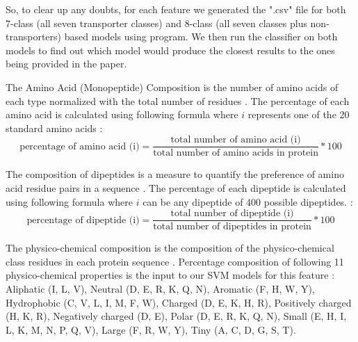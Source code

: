     So, to clear up any doubts, for each feature we generated the ".csv" file for both 7-class (all seven transporter classes) and 8-class 
    (all seven classes plus non-transporters) based models using  program. We then run the 
    classifier on both models to find out which model would produce the closest results to the ones being provided in the paper.
    
    
    
    The Amino Acid (Monopeptide) Composition is the number of amino acids of each type normalized with the total number of 
    residues \cite{gromiha2010protein}. The percentage of each amino acid is calculated using following formula where $i$ 
    represents one of the 20 standard amino acids \cite{mishra2014prediction} :
    \begin{equation}
        \text{percentage of amino acid (i)} = \frac {\text{total number of amino acid (i)}} {\text{total number of amino acids in protein}} * 100
    \end{equation} 
    
    
    The composition of dipeptides is a measure to quantify the preference of amino acid residue pairs in a sequence 
    \cite{gromiha2010protein}. The percentage of each dipeptide is calculated using following formula where $i$ 
    can be any dipeptide of 400 possible dipeptides. \cite{mishra2014prediction}:
    \begin{equation}
        \text{percentage of dipeptide (i)} = \frac {\text{total number of dipeptide (i)}} {\text{total number of dipeptides in protein}} * 100
    \end{equation}


    
    The physico-chemical composition is the composition of the physico-chemical class residues in each protein sequence 
    \cite{mishra2014prediction}. Percentage composition of following 11 physico-chemical properties is the input to our 
    SVM models for this feature \cite{mishra2014prediction, kumar2008copid}:\\
    
    Aliphatic (I, L, V), Neutral (D, E, R, K, Q, N), Aromatic (F, H, W, Y),
    Hydrophobic (C, V, L, I, M, F, W), Charged (D, E, K, H, R), Positively charged (H, K, R), 
    Negatively charged (D, E), Polar (D, E, R, K, Q, N),
    Small (E, H, I, L, K, M, N, P, Q, V), Large (F, R, W, Y), Tiny (A, C, D, G, S, T).

